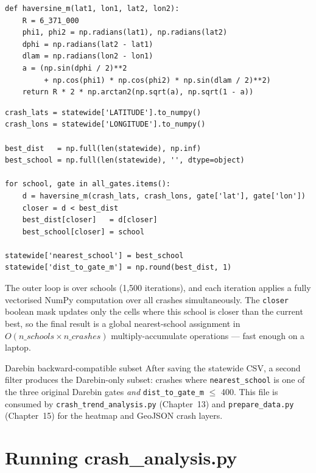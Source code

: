 \documentclass[11pt,a4paper,openany]{book}
\begin{document}
\begin{lstlisting}[style=python, caption={Haversine distance (radians, returns metres).}]
def haversine_m(lat1, lon1, lat2, lon2):
    R = 6_371_000
    phi1, phi2 = np.radians(lat1), np.radians(lat2)
    dphi = np.radians(lat2 - lat1)
    dlam = np.radians(lon2 - lon1)
    a = (np.sin(dphi / 2)**2
         + np.cos(phi1) * np.cos(phi2) * np.sin(dlam / 2)**2)
    return R * 2 * np.arctan2(np.sqrt(a), np.sqrt(1 - a))
\end{lstlisting}

\begin{lstlisting}[style=python, caption={Vectorised nearest-school assignment.}]
crash_lats = statewide['LATITUDE'].to_numpy()
crash_lons = statewide['LONGITUDE'].to_numpy()

best_dist   = np.full(len(statewide), np.inf)
best_school = np.full(len(statewide), '', dtype=object)

for school, gate in all_gates.items():
    d = haversine_m(crash_lats, crash_lons, gate['lat'], gate['lon'])
    closer = d < best_dist
    best_dist[closer]   = d[closer]
    best_school[closer] = school

statewide['nearest_school'] = best_school
statewide['dist_to_gate_m'] = np.round(best_dist, 1)
\end{lstlisting}

The outer loop is over schools (1,500 iterations), and each iteration applies a
fully vectorised NumPy computation over all crashes simultaneously.
The \texttt{closer} boolean mask updates only the cells where this school is
closer than the current best, so the final result is a global nearest-school
assignment in $O(n\_schools \times n\_crashes)$ multiply-accumulate operations ---
fast enough on a laptop.

\begin{tipbox}{Darebin backward-compatible subset}
After saving the statewide CSV, a second filter produces the Darebin-only subset:
crashes where \texttt{nearest\_school} is one of the three original Darebin gates
\emph{and} \texttt{dist\_to\_gate\_m} $\leq$ 400.  This file is consumed by
\texttt{crash\_trend\_analysis.py} (Chapter~13) and \texttt{prepare\_data.py}
(Chapter~15) for the heatmap and GeoJSON crash layers.
\end{tipbox}

\section{Running crash\_analysis.py}
\end{document}

